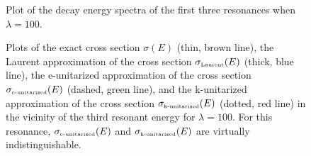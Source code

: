 \documentclass[12pt]{article}
\begin{document}
\begin{figure}[H]
\begin{center}
              \epsfxsize=11cm
\end{center}                
\caption{Plot of the decay energy spectra of the first three
resonances when $\lambda =100$.}
\label{fig:spikes}
\end{figure} 




\begin{figure}[H]
\begin{center}
              \epsfxsize=12cm
\end{center}                
\caption{Plots of the exact cross section $\sigma (E)$ (thin, brown line), 
the Laurent approximation of the cross section $\sigma_{\text{\tiny Laurent}}(E)$
(thick, blue line), the e-unitarized approximation of the cross section
$\sigma_{\text{\tiny e-unitarized}}(E)$ (dashed, green line), and the k-unitarized
approximation of the cross section $\sigma_{\text{\tiny k-unitarized}}(E)$
(dotted, red line) in the vicinity of the third resonant energy for
$\lambda =100$. For this resonance, $\sigma_{\text{\tiny e-unitarized}}(E)$
and $\sigma_{\text{\tiny k-unitarized}}(E)$ are virtually indistinguishable.}
\label{fig:peaks}
\end{figure} 










  
\end{document}
